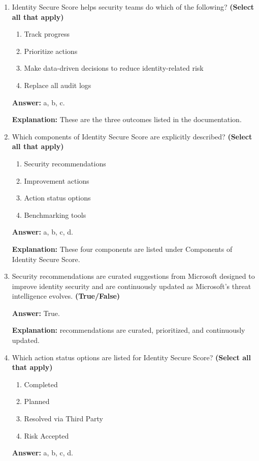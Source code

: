 \documentclass[10pt]{article}
\begin{document}
\begin{enumerate}[leftmargin=*]
\textbf{Explanation:} This is the exact definition in the Identity Secure Score section.

\item Identity Secure Score helps security teams do which of the following? \textbf{(Select all that apply)}
\begin{enumerate}[label=\alph*., leftmargin=1.5em]
\item Track progress
\item Prioritize actions
\item Make data-driven decisions to reduce identity-related risk
\item Replace all audit logs
\end{enumerate}
\textbf{Answer:} a, b, c.

\textbf{Explanation:} These are the three outcomes listed in the documentation.

\item Which components of Identity Secure Score are explicitly described? \textbf{(Select all that apply)}
\begin{enumerate}[label=\alph*., leftmargin=1.5em]
\item Security recommendations
\item Improvement actions
\item Action status options
\item Benchmarking tools
\end{enumerate}
\textbf{Answer:} a, b, c, d.

\textbf{Explanation:} These four components are listed under Components of Identity Secure Score.

\item Security recommendations are curated suggestions from Microsoft designed to improve identity security and are continuously updated as Microsoft’s threat intelligence evolves. \textbf{(True/False)}

\textbf{Answer:} True.

\textbf{Explanation:} recommendations are curated, prioritized, and continuously updated.

\item Which action status options are listed for Identity Secure Score? \textbf{(Select all that apply)}
\begin{enumerate}[label=\alph*., leftmargin=1.5em]
\item Completed
\item Planned
\item Resolved via Third Party
\item Risk Accepted
\end{enumerate}
\textbf{Answer:} a, b, c, d.


\end{enumerate}
\end{document}
